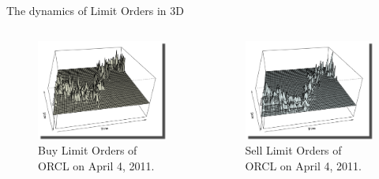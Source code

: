 \documentclass{beamer}
\begin{document}
\begin{frame}[shrink=40]{{\color{cyan}The dynamics of Limit Orders in 3D}}
\vskip 0.5in

\begin{columns}

\begin{column}{0.48\textwidth}
\begin{figure}[htbp]
                \centering
                \includegraphics[width=\textwidth]{ORCL/ORCL_20110404_BuySize_3D_5min.png}
                \caption{Buy Limit Orders of ORCL on April 4, 2011.}
                \label{fig:ORCL_BuySize_3D}
\end{figure}
\end{column}

\begin{column}{0.48\textwidth}
\begin{figure}[htbp]
                \centering
                \includegraphics[width=\textwidth]{ORCL/ORCL_20110404_SellSize_3D_5min.png}
                \caption{Sell Limit Orders of ORCL on April 4, 2011.}
                \label{fig:ORCL_SellSize_3D}
\end{figure}
\end{column}


\end{columns}
\end{frame}
\end{document}
